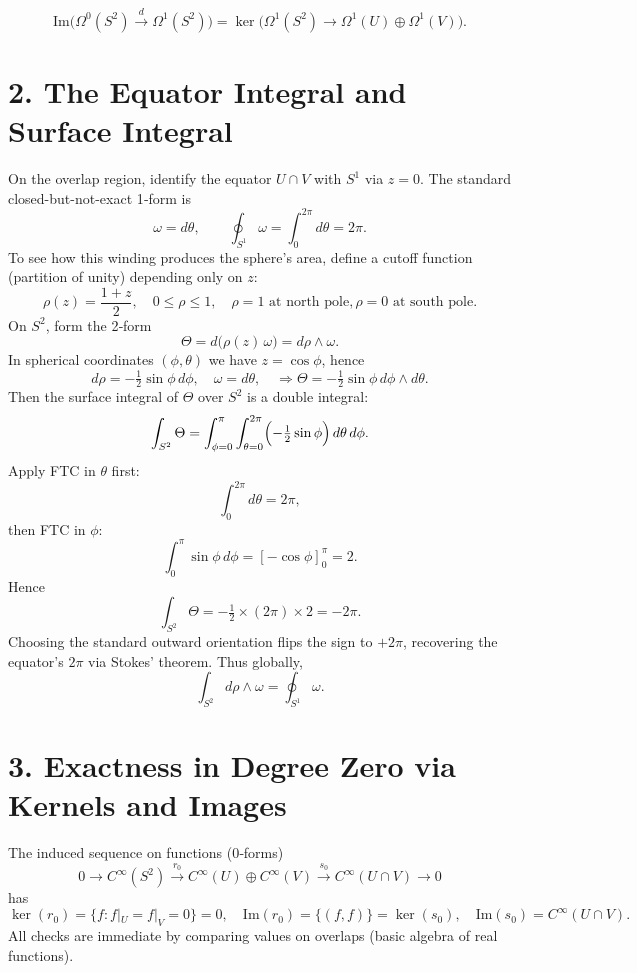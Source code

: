 \documentclass[11pt]{article}
\begin{document}
	\[
	\mathrm{Im}\bigl(\Omega^0(S^2) \xrightarrow{d} \Omega^1(S^2)\bigr)
	= \ker\bigl(\Omega^1(S^2) \to \Omega^1(U)\oplus\Omega^1(V)\bigr).
	\]
	
	\section{2. The Equator Integral and Surface Integral}
	On the overlap region, identify the equator $U\cap V$ with $S^1$ via $z=0$.  The standard closed-but-not-exact 1‑form is
	\[
	\omega = d\theta,
	\qquad \oint_{S^1}\omega = \int_{0}^{2\pi}d\theta = 2\pi.
	\]
	To see how this winding produces the sphere’s area, define a cutoff function (partition of unity) depending only on $z$:
	\[
	\rho(z) = \frac{1+z}{2},
	\quad 0\le \rho\le1, \quad \rho=1\text{ at north pole}, \rho=0\text{ at south pole}.
	\]
	On $S^2$, form the 2‑form
	\[
	\Theta = d\bigl(\rho(z)\,\omega\bigr) = d\rho\wedge\omega.
	\]
	In spherical coordinates $(\phi,\theta)$ we have $z=\cos\phi$, hence
	\[
	d\rho = -\tfrac12\sin\phi\,d\phi,
	\quad \omega = d\theta,
	\quad \Rightarrow \Theta = -\tfrac12\sin\phi\,d\phi\wedge d\theta.
	\]
	Then the surface integral of $\Theta$ over $S^2$ is a double integral:
	\[
	\int_{S^2}\Theta = \int_{\phi=0}^{\pi}\int_{\theta=0}^{2\pi}\Bigl(-\tfrac12\sin\phi\Bigr)\,d\theta\,d\phi.
	\]
	Apply FTC in $\theta$ first:
	\[
	\int_{0}^{2\pi}d\theta = 2\pi,
	\]
	then FTC in $\phi$:
	\[
	\int_{0}^{\pi}\sin\phi\,d\phi = [-\cos\phi]_0^{\pi} = 2.
	\]
	Hence
	\[
	\int_{S^2}\Theta = -\tfrac12\times(2\pi)\times2 = -2\pi.
	\]
	Choosing the standard outward orientation flips the sign to $+2\pi$, recovering the equator’s $2\pi$ via Stokes’ theorem.  Thus globally,
	\[
	\int_{S^2}d\rho\wedge\omega = \oint_{S^1}\omega.
	\]
	
	\section{3. Exactness in Degree Zero via Kernels and Images}
	The induced sequence on functions (0‑forms)
	\[
	0 \to C^\infty(S^2) \xrightarrow{r_0} C^\infty(U)\oplus C^\infty(V)
	\xrightarrow{s_0} C^\infty(U\cap V) \to 0
	\]
	has
	\[
	\ker(r_0)=\{f: f|_U=f|_V=0\} = 0,
	\quad
	\mathrm{Im}(r_0)=\{(f,f)\}
	= \ker(s_0),
	\quad
	\mathrm{Im}(s_0)=C^\infty(U\cap V).
	\]
	All checks are immediate by comparing values on overlaps (basic algebra of real functions).
	
\end{document}
